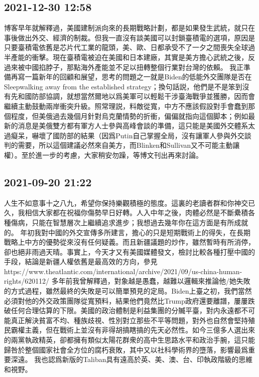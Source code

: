 \documentclass[twocolumn]{ctexart}
\begin{document}
\subsection*{2021-12-30 12:58}

博客早年就解釋過，美國建制派向來的長期戰略計劃，都是如果發生武統，就只在事後做出外交、經濟的制裁。但我一直沒有談美國可以封鎖臺積電的選項，原因是只要臺積電依舊是芯片代工業的龍頭，美、歐、日都承受不了一夕之間喪失全球過半產能的衝擊。現在臺積電被迫在美國和日本建廠，其實是美方擔心武統之後，反過來被中國掐脖子，那點海外產能並不足以扭轉整個行業對台灣的依賴。
我正準備再寫一篇新年的回顧和展望，思考的問題之一就是Biden的低能外交團隊是否在Sleepwalking away from the established strategy；換句話説，他們是不是笨到沒有先和國防部協調，就想當然爾地以爲美軍可以輕鬆干涉臺海戰爭並獲勝，因而會繼續主動鼓動兩岸衝突升級。照常理説，料敵從寬，中方不應該假設對手會蠢到那個程度，但美俄過去幾個月針對烏克蘭情勢的折衝，偏偏就指向這個脚本；例如最新的消息是美俄雙方都有軍方人士參與高峰會談的準備，這只能是美國外交體系太過癡呆，嚇壞了國防部的結果（因爲Putin自己掌握全局，沒有讓軍人參與外交談判的需要，所以這個建議必然來自美方，而Blinken和Sullivan又不可能主動讓權）。至於進一步的考慮，大家稍安勿躁，等博文刊出再來討論。
\subsection*{2021-09-20 21:22}

人生不如意事十之八九，希望你保持樂觀積極的態度。這裏的老讀者群和你神交已久，我相信大家都在祝福你傷勢早日好轉。人入中年之後，肉體必然是不斷纍積各種傷病，只能在智慧層次上繼續追求進步；我想過去幾年你在這方面是有所成就的。
年初我對中國的外交宣傳多所建言，擔心的只是短期戰術上的得失，在長期戰略上中方的優勢從來沒有任何疑義。而且新疆議題的炒作，雖然暫時有所消停，卻也絕非雨過天晴。事實上，今天才又有美國媒體發文，檢討比較各種打壓中國的手段，結論是新疆人權依舊是最高效的方向，參見https://www.theatlantic.com/international/archive/2021/09/us-china-human-rights/620112/
多年前我曾解釋過，對象越是愚蠢，越難以邏輯來推論他/她失敗的方式過程，雖然最終的失敗是可以簡單預見的定局。Biden上臺之初，我們當然必須對他的外交政策團隊從寬預料，結果他們竟然比Trump政府還要離譜，屢屢跌破任何合理估算的下限。美國的政治體制是利益集團的分贓平臺，對内永遠都不可能真正解決貧富不均、種族歧視、性別對立那些不平等問題，對外也自然會堅持殖民霸權主義，但在戰術上並沒有非得胡搞瞎搞的先天必然性。如今三億多人選出來的兩黨執政精英，卻都擁有類似太陽花群衆的高中生思路水平和政治手腕，這只能歸咎於整個國家社會全方位的腐朽衰敗，其中又以社科學術界的墮落，影響最爲重要深遠。
我也認爲新版的Taliban具有遠高於英、美、澳、台、印執政階級的思維和視野。
\end{document}
